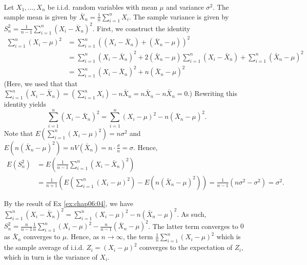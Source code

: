\begin{Solution}{1.13}
			Let $X_1, \ldots, X_n$ be i.i.d. random variables with mean $\mu$ and variance $\sigma^2$. The sample mean is given by $\bar{X}_n = \frac{1}{n} \sum_{i = 1}^n X_i$. The sample variance is given by $S_n^2 = \frac{1}{n - 1} \sum_{i = 1}^n (X_i - \bar{X}_n)^2$. First, we construct the identity
			\begin{align*}
				\sum_{i = 1}^n (X_i - \mu)^2 & = \sum_{i = 1}^n ((X_i - \bar{X}_n) + (\bar{X}_n - \mu))^2 \\
				& = \sum_{i = 1}^n (X_i - \bar{X}_n)^2 + 2 (\bar{X}_n - \mu) \sum_{i = 1}^n (X_i - \bar{X}_n) + \sum_{i = 1}^n (\bar{X}_n - \mu)^2 \\
				& = \sum_{i = 1}^n (X_i - \bar{X}_n)^2 + n (\bar{X}_n - \mu)^2
			\end{align*}
			(Here, we used that that $\sum_{i = 1}^n (X_i - \bar{X}_n) = \left(\sum_{i = 1}^n X_i\right) - n \bar{X}_n = n \bar{X}_n - n \bar{X}_n = 0$.) Rewriting this identity yields
			\begin{equation*}
				\sum_{i = 1}^n (X_i - \bar{X}_n)^2 = \sum_{i = 1}^n (X_i - \mu)^2 - n (\bar{X}_n - \mu)^2.
			\end{equation*}
			Note that $E(\sum_{i = 1}^n (X_i - \mu)^2) = n \sigma^2$ and $E(n (\bar{X}_n - \mu)^2) = n V(\bar{X}_n) = n \cdot \frac{\sigma}{n} = \sigma$. Hence,
			\begin{align*}
				E(S_n^2) & = E\left(\frac{1}{n - 1} \sum_{i = 1}^n (X_i - \bar{X}_n)^2\right) \\
				& = \frac{1}{n + 1} \left(E\left(\sum_{i = 1}^n (X_i - \mu)^2\right) - E\left(n\left(\bar{X}_n - \mu\right)^2\right)\right) = \frac{1}{n - 1} (n \sigma^2 - \sigma^2) = \sigma^2.
			\end{align*}
		
\end{Solution}
\begin{Solution}{1.14}
		By the result of Ex \ref{ex:chap06:04}, we have $\sum_{i = 1}^n (X_i - \bar{X}_n)^2 = \sum_{i = 1}^n (X_i - \mu)^2 - n (\bar{X}_n - \mu)^2$. As such, $S_n^2 = \frac{n}{n - 1}\frac{1}{n} \sum_{i = 1}^n (X_i - \mu)^2 - \frac{n}{n - 1} (\bar{X}_n - \mu)^2$. The latter term converges to $0$ as $\bar{X}_n$ converges to $\mu$. Hence, as $n \to \infty$, the term $\frac{1}{n} \sum_{i = 1}^n (X_i - \mu)^2$ which is the sample average of i.i.d. $Z_i=(X_i - \mu)^2$ converges to the expectation of $Z_i$, which in turn is the variance of $X_i$.
		
\end{Solution}
